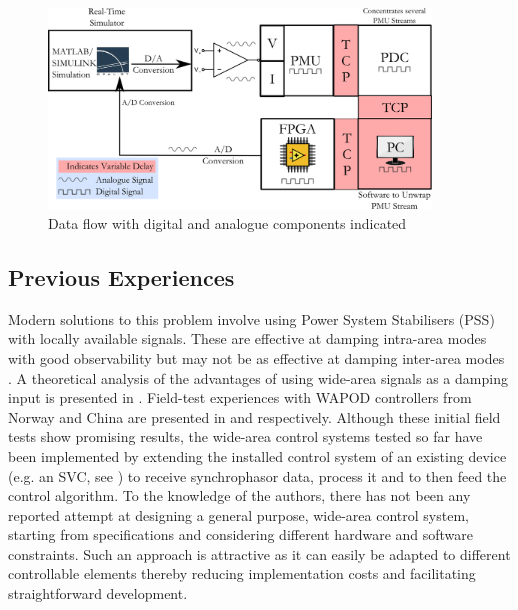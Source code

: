 \documentclass[conference]{IEEEtran}
\begin{document}
\begin{figure}[]
\centering
\includegraphics[width=4in]{DataFlow.png}
\caption{Data flow with digital and analogue components indicated}
\label{Data_path}
\end{figure}

\subsection{Previous Experiences}
Modern solutions to this problem involve using Power System Stabilisers (PSS) with locally available signals. These are effective at damping intra-area modes with good observability but may not be as effective at damping inter-area modes \cite{WAPODNorway} \cite{localREMcomparison}. A theoretical analysis of the advantages of using wide-area signals as a damping input is presented in \cite{Yuwa}. Field-test experiences with WAPOD controllers from Norway and China are presented in \cite{WAPODNorway} and \cite{WAPODChina} respectively. Although these initial field tests show promising results, the wide-area control systems tested so far have been implemented by extending the installed control system of an existing device (e.g. an SVC, see \cite{WAPODNorway}) to receive synchrophasor data, process it and to then feed the control algorithm. To the knowledge of the authors, there has not been any reported attempt at designing a general purpose, wide-area control system, starting from specifications and considering different hardware and software constraints. Such an approach is attractive as it can easily be adapted to different controllable elements thereby reducing implementation costs and facilitating straightforward development.
\end{document}

